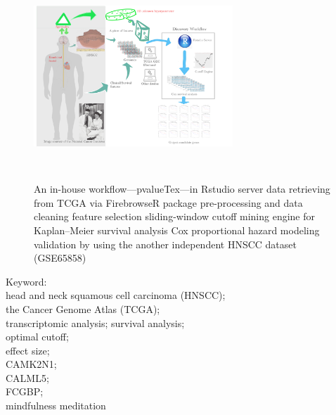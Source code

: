 \documentclass[
paper=landscape,
paper=160mm:90mm, %
fontsize=11pt, %
pagesize, %
parskip=half-, %
]{scrartcl} %
\theoremstyle{mythmstyle} %
\begin{document}
\begin{figure}
  \begin{minipage}[c]{0.4\linewidth}
    \centering
    \includegraphics[height=7.0cm, width=7.5cm]{graphic_abstract_pvalueTex.pdf}%
  \end{minipage}\hfill
  \begin{minipage}[c]{0.6\linewidth}
    \centering
    \begin{outline}
    \1 An in-house workflow---pvalueTex---in Rstudio server
        \2 data retrieving from TCGA via FirebrowseR package
        \2 pre-processing and data cleaning
        \2 feature selection
        \2 sliding-window cutoff mining engine for Kaplan--Meier survival analysis
        \2 Cox proportional hazard modeling
        \2 validation by using the another independent HNSCC dataset (GSE65858)~\cite{Wichmann2015}

    \end{outline}
  \end{minipage}
\end{figure}

\clearpage


Keyword:\\
head and neck squamous cell carcinoma (HNSCC);\\
the Cancer Genome Atlas (TCGA); \\
transcriptomic analysis; survival analysis; \\
optimal cutoff; \\
effect size; \\
\acrfull{CAMK2N1}; \\
\acrfull{CALML5}; \\
\acrfull{FCGBP}; \\
mindfulness meditation
\end{document}
